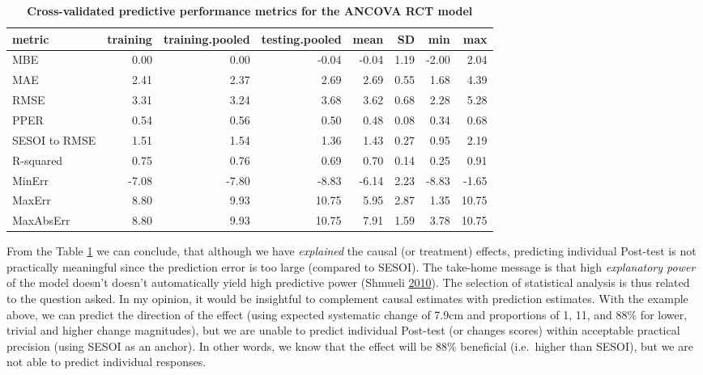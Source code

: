 \documentclass[
]{book}
\begin{document}
\begin{table}

\caption{\label{tab:ancova-rct-model-perf-metrics}\textbf{Cross-validated predictive performance metrics for the ANCOVA RCT model}}
\centering
\begin{tabular}[t]{lrrrrrrr}
\toprule
metric & training & training.pooled & testing.pooled & mean & SD & min & max\\
\midrule
MBE & 0.00 & 0.00 & -0.04 & -0.04 & 1.19 & -2.00 & 2.04\\
MAE & 2.41 & 2.37 & 2.69 & 2.69 & 0.55 & 1.68 & 4.39\\
RMSE & 3.31 & 3.24 & 3.68 & 3.62 & 0.68 & 2.28 & 5.28\\
PPER & 0.54 & 0.56 & 0.50 & 0.48 & 0.08 & 0.34 & 0.68\\
SESOI to RMSE & 1.51 & 1.54 & 1.36 & 1.43 & 0.27 & 0.95 & 2.19\\
\addlinespace
R-squared & 0.75 & 0.76 & 0.69 & 0.70 & 0.14 & 0.25 & 0.91\\
MinErr & -7.08 & -7.80 & -8.83 & -6.14 & 2.23 & -8.83 & -1.65\\
MaxErr & 8.80 & 9.93 & 10.75 & 5.95 & 2.87 & 1.35 & 10.75\\
MaxAbsErr & 8.80 & 9.93 & 10.75 & 7.91 & 1.59 & 3.78 & 10.75\\
\bottomrule
\end{tabular}
\end{table}

From the Table \ref{tab:ancova-rct-model-perf-metrics} we can conclude, that although we have \emph{explained} the causal (or treatment) effects, predicting individual Post-test is not practically meaningful since the prediction error is too large (compared to SESOI). The take-home message is that high \emph{explanatory power} of the model doesn't doesn't automatically yield high predictive power (Shmueli \protect\hyperlink{ref-shmueliExplainPredict2010}{2010}). The selection of statistical analysis is thus related to the question asked. In my opinion, it would be insightful to complement causal estimates with prediction estimates. With the example above, we can predict the direction of the effect (using expected systematic change of 7.9cm and proportions of 1, 11, and 88\% for lower, trivial and higher change magnitudes), but we are unable to predict individual Post-test (or changes scores) within acceptable practical precision (using SESOI as an anchor). In other words, we know that the effect will be 88\% beneficial (i.e.~higher than SESOI), but we are not able to predict individual responses.
\end{document}
